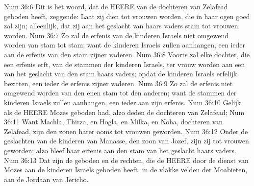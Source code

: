 Num 36:6  Dit is het woord, dat de HEERE van de dochteren van Zelafead geboden heeft, zeggende: Laat zij dien tot vrouwen worden, die in haar ogen goed zal zijn; alleenlijk, dat zij aan het geslacht van haars vaders stam tot vrouwen worden.
Num 36:7  Zo zal de erfenis van de kinderen Israels niet omgewend worden van stam tot stam; want de kinderen Israels zullen aanhangen, een ieder aan de erfenis van den stam zijner vaderen.
Num 36:8  Voorts zal elke dochter, die een erfenis erft, van de stammen der kinderen Israels, ter vrouw worden aan een van het geslacht van den stam haars vaders; opdat de kinderen Israels erfelijk bezitten, een ieder de erfenis zijner vaderen.
Num 36:9  Zo zal de erfenis niet omgewend worden van den enen stam tot den anderen; want de stammen der kinderen Israels zullen aanhangen, een ieder aan zijn erfenis.
Num 36:10  Gelijk als de HEERE Mozes geboden had, alzo deden de dochteren van Zelafead;
Num 36:11  Want Machla, Thirza, en Hogla, en Milka, en Noha, dochteren van Zelafead, zijn den zonen harer ooms tot vrouwen geworden.
Num 36:12  Onder de geslachten van de kinderen van Manasse, den zoon van Jozef, zijn zij tot vrouwen geworden; alzo bleef haar erfenis aan den stam van het geslacht haars vaders.
Num 36:13  Dat zijn de geboden en de rechten, die de HEERE door de dienst van Mozes aan de kinderen Israels geboden heeft, in de vlakke velden der Moabieten, aan de Jordaan van Jericho.



